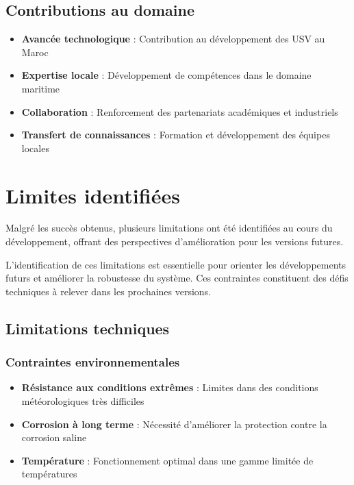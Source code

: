 {\subsection{Contributions au domaine}
\begin{itemize}
    \item \textbf{Avancée technologique} : Contribution au développement des USV au Maroc
    \item \textbf{Expertise locale} : Développement de compétences dans le domaine maritime
    \item \textbf{Collaboration} : Renforcement des partenariats académiques et industriels
    \item \textbf{Transfert de connaissances} : Formation et développement des équipes locales
\end{itemize}

\section{Limites identifiées}
Malgré les succès obtenus, plusieurs limitations ont été identifiées au cours du développement, offrant des perspectives d'amélioration pour les versions futures.

\begin{block}[warning]
L'identification de ces limitations est essentielle pour orienter les développements futurs et améliorer la robustesse du système. Ces contraintes constituent des défis techniques à relever dans les prochaines versions.
\end{block}

\subsection{Limitations techniques}
\subsubsection{Contraintes environnementales}
\begin{itemize}
    \item \textbf{Résistance aux conditions extrêmes} : Limites dans des conditions météorologiques très difficiles
    \item \textbf{Corrosion à long terme} : Nécessité d'améliorer la protection contre la corrosion saline
    \item \textbf{Température} : Fonctionnement optimal dans une gamme limitée de températures
\end{itemize}

}
